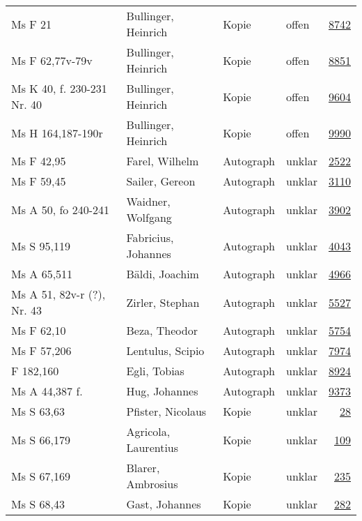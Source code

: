 \documentclass[10pt,a4paper,landscape]{report}
\begin{document}
\begin{longtable}{p{16cm}p{4cm}llr}
Ms F 21	&	Bullinger, Heinrich	&	Kopie	&	offen	&	\href{http://130.60.24.72/assignment/8742}{8742}\\
Ms F 62,77v-79v	&	Bullinger, Heinrich	&	Kopie	&	offen	&	\href{http://130.60.24.72/assignment/8851}{8851}\\
Ms K 40, f. 230-231 Nr. 40	&	Bullinger, Heinrich	&	Kopie	&	offen	&	\href{http://130.60.24.72/assignment/9604}{9604}\\
Ms H 164,187-190r	&	Bullinger, Heinrich	&	Kopie	&	offen	&	\href{http://130.60.24.72/assignment/9990}{9990}\\
Ms F 42,95	&	Farel, Wilhelm	&	Autograph	&	unklar	&	\href{http://130.60.24.72/assignment/2522}{2522}\\
Ms F 59,45	&	Sailer, Gereon	&	Autograph	&	unklar	&	\href{http://130.60.24.72/assignment/3110}{3110}\\
Ms A 50, fo 240-241	&	Waidner, Wolfgang	&	Autograph	&	unklar	&	\href{http://130.60.24.72/assignment/3902}{3902}\\
Ms S 95,119	&	Fabricius, Johannes	&	Autograph	&	unklar	&	\href{http://130.60.24.72/assignment/4043}{4043}\\
Ms A 65,511	&	Bäldi, Joachim	&	Autograph	&	unklar	&	\href{http://130.60.24.72/assignment/4966}{4966}\\
Ms A 51, 82v-r (?), Nr. 43	&	Zirler, Stephan	&	Autograph	&	unklar	&	\href{http://130.60.24.72/assignment/5527}{5527}\\
Ms F 62,10	&	Beza, Theodor	&	Autograph	&	unklar	&	\href{http://130.60.24.72/assignment/5754}{5754}\\
Ms F 57,206	&	Lentulus, Scipio	&	Autograph	&	unklar	&	\href{http://130.60.24.72/assignment/7974}{7974}\\
F 182,160	&	Egli, Tobias	&	Autograph	&	unklar	&	\href{http://130.60.24.72/assignment/8924}{8924}\\
Ms A 44,387 f.	&	Hug, Johannes	&	Autograph	&	unklar	&	\href{http://130.60.24.72/assignment/9373}{9373}\\
Ms S 63,63	&	Pfister, Nicolaus	&	Kopie	&	unklar	&	\href{http://130.60.24.72/assignment/28}{28}\\
Ms S 66,179	&	Agricola, Laurentius	&	Kopie	&	unklar	&	\href{http://130.60.24.72/assignment/109}{109}\\
Ms S 67,169	&	Blarer, Ambrosius	&	Kopie	&	unklar	&	\href{http://130.60.24.72/assignment/235}{235}\\
Ms S 68,43	&	Gast, Johannes	&	Kopie	&	unklar	&	\href{http://130.60.24.72/assignment/282}{282}\\

\end{longtable}
\end{document}
